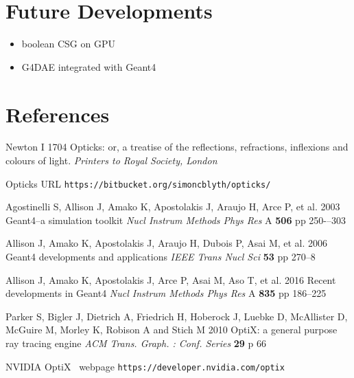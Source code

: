 \documentclass[a4paper]{jpconf}
\begin{document}
\section{Future Developments}
\begin{itemize}
\item boolean CSG on GPU
\item G4DAE integrated with Geant4
\end{itemize}




\section*{References}
\begin{thebibliography}{9}

Newton I 
1704 
Opticks: or, a treatise of the reflections, refractions, inflexions and colours of light.
{\it Printers to Royal Society, London} 

Opticks URL {\tt https://bitbucket.org/simoncblyth/opticks/}


Agostinelli S, Allison J, Amako K, Apostolakis J, Araujo H, Arce P, et al. 
2003  
Geant4--a simulation toolkit 
{\it Nucl Instrum Methods Phys Res} A {\bf 506} pp 250-–303 

Allison J, Amako K, Apostolakis J, Araujo H, Dubois P, Asai M, et al. 
2006 
Geant4 developments and applications 
{\it IEEE Trans Nucl Sci} {\bf 53} pp 270--8

Allison J, Amako K, Apostolakis J, Arce P, Asai M, Aso T, et al. 
2016 
Recent developments in Geant4 
{\it Nucl Instrum Methods Phys Res} A {\bf 835} pp 186--225




Parker S, Bigler J, Dietrich A, Friedrich H, Hoberock J, Luebke D, McAllister D, McGuire M, Morley K, Robison A and Stich M 
2010 
OptiX: a general purpose ray tracing engine
{\it ACM Trans. Graph. : Conf. Series} {\bf 29} p 66 

NVIDIA{\textregistered} OptiX\texttrademark~ webpage {\tt https://developer.nvidia.com/optix}








\end{thebibliography}
\end{document}
